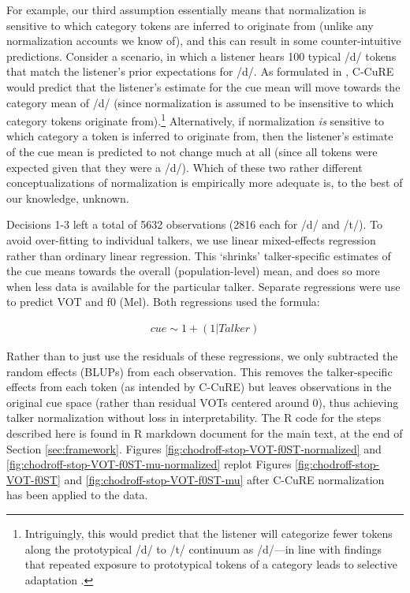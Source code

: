 \documentclass[
  11pt,
  man,floatsintext]{apa6}
\begin{document}
For example, our third assumption essentially means that normalization is sensitive to which category tokens are inferred to originate from (unlike any normalization accounts we know of), and this can result in some counter-intuitive predictions. Consider a scenario, in which a listener hears 100 typical /d/ tokens that match the listener's prior expectations for /d/. As formulated in \textcite{mcmurray-jongman2011}, C-CuRE would predict that the listener's estimate for the cue mean will move towards the category mean of /d/ (since normalization is assumed to be insensitive to which category tokens originate from).\footnote{Intriguingly, this would predict that the listener will categorize fewer tokens along the prototypical /d/ to /t/ continuum as /d/---in line with findings that repeated exposure to prototypical tokens of a category leads to selective adaptation \autocites[e.g.,][]{samuel1986,samuel2021,vroomen2007}[for discussion, see also][]{kleinschmidt-jaeger2016pbr}.} Alternatively, if normalization \emph{is} sensitive to which category a token is inferred to originate from, then the listener's estimate of the cue mean is predicted to not change much at all (since all tokens were expected given that they were a /d/). Which of these two rather different conceptualizations of normalization is empirically more adequate is, to the best of our knowledge, unknown.

Decisions 1-3 left a total of 5632 observations (2816 each for /d/ and /t/). To avoid over-fitting to individual talkers, we use linear mixed-effects regression rather than ordinary linear regression. This `shrinks' talker-specific estimates of the cue means towards the overall (population-level) mean, and does so more when less data is available for the particular talker. Separate regressions were use to predict VOT and f0 (Mel). Both regressions used the formula:

\begin{equation}\label{eq:c-cure-regression}
\begin{split}
cue \sim 1 + (1 | Talker)
\end{split}
\end{equation}

Rather than to just use the residuals of these regressions, we only subtracted the random effects (BLUPs) from each observation. This removes the talker-specific effects from each token (as intended by C-CuRE) but leaves observations in the original cue space (rather than residual VOTs centered around 0), thus achieving talker normalization without loss in interpretability. The R code for the steps described here is found in R markdown document for the main text, at the end of Section \ref{sec:framework}. Figures \ref{fig:chodroff-stop-VOT-f0ST-normalized} and \ref{fig:chodroff-stop-VOT-f0ST-mu-normalized} replot Figures \ref{fig:chodroff-stop-VOT-f0ST} and \ref{fig:chodroff-stop-VOT-f0ST-mu} after C-CuRE normalization has been applied to the data.
\end{document}
